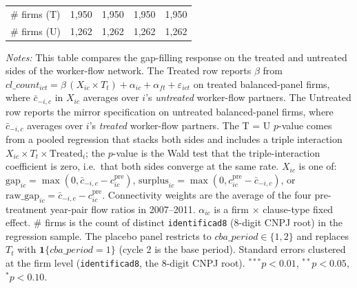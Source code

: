 \begin{table}[H]
\begin{tabular}{lcccc}
\# firms (T) & 1,950 & 1,950 & 1,950 & 1,950 \\
\# firms (U) & 1,262 & 1,262 & 1,262 & 1,262 \\
\bottomrule
\end{tabular}
\begin{minipage}{\linewidth}
\footnotesize\vspace{4pt}
\textit{Notes:} This table compares the gap-filling response on the treated and untreated sides of the worker-flow network. The Treated row reports $\beta$ from $cl\_count_{ict} = \beta\,(X_{ic} \times T_t) + \alpha_{ic} + \alpha_{ft} + \varepsilon_{ict}$ on treated balanced-panel firms, where $\bar c_{-i,c}$ in $X_{ic}$ averages over $i$'s \textit{untreated} worker-flow partners. The Untreated row reports the mirror specification on untreated balanced-panel firms, where $\bar c_{-i,c}$ averages over $i$'s \textit{treated} worker-flow partners. The T = U $p$-value comes from a pooled regression that stacks both sides and includes a triple interaction $X_{ic} \times T_t \times \text{Treated}_i$; the $p$-value is the Wald test that the triple-interaction coefficient is zero, i.e.\ that both sides converge at the same rate. $X_{ic}$ is one of: $\text{gap}_{ic} = \max(0, \bar{c}_{-i,c} - c^{\text{pre}}_{ic})$, $\text{surplus}_{ic} = \max(0, c^{\text{pre}}_{ic} - \bar{c}_{-i,c})$, or $\text{raw\_gap}_{ic} = \bar{c}_{-i,c} - c^{\text{pre}}_{ic}$. Connectivity weights are the average of the four pre-treatment year-pair flow ratios in 2007--2011. $\alpha_{ic}$ is a firm $\times$ clause-type fixed effect. \# firms is the count of distinct \texttt{identificad8} (8-digit CNPJ root) in the regression sample. The placebo panel restricts to $cba\_period \in \{1, 2\}$ and replaces $T_t$ with $\mathbf{1}\{cba\_period = 1\}$ (cycle 2 is the base period). Standard errors clustered at the firm level (\texttt{identificad8}, the 8-digit CNPJ root). $^{***}p<0.01$, $^{**}p<0.05$, $^{*}p<0.10$.
\end{minipage}
\end{table}
